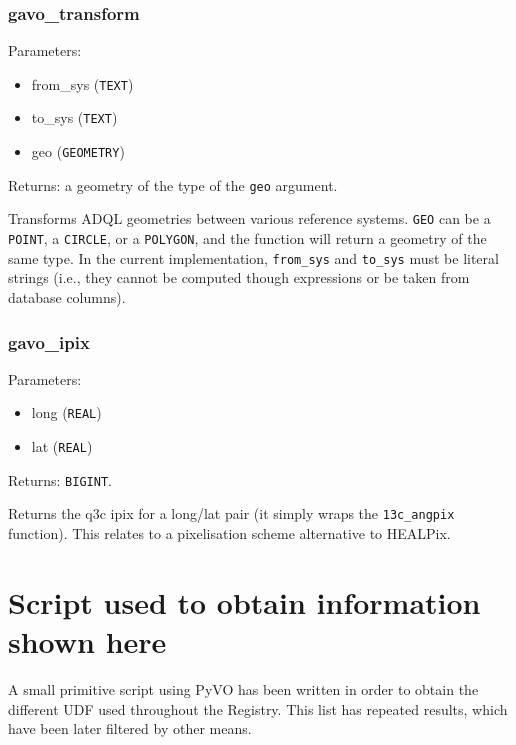 \documentclass[11pt,a4paper]{ivoa}
\begin{document}
\subsubsection{gavo\_transform}

Parameters:

\begin{itemize}
	\item from\_sys (\texttt{TEXT})
	\item to\_sys (\texttt{TEXT})
	\item geo (\texttt{GEOMETRY})
\end{itemize}

Returns: a geometry of the type of the \texttt{geo} argument.

Transforms ADQL geometries between various reference systems.
\texttt{GEO} can be a \texttt{POINT}, a \texttt{CIRCLE}, or a
\texttt{POLYGON}, and the function will return a geometry of the same
type. In the current implementation, \texttt{from\_sys} and
\texttt{to\_sys} must be literal strings (i.e., they cannot be computed
though expressions or be taken from database columns).

\subsubsection{gavo\_ipix}

Parameters:

\begin{itemize}
	\item long (\texttt{REAL})
	\item lat (\texttt{REAL})
\end{itemize}

Returns: \texttt{BIGINT}.

Returns the q3c ipix \citep{soft:q3c} for a long/lat pair (it simply
wraps the \texttt{13c\_angpix} function). This relates to a pixelisation
scheme alternative to HEALPix.

\appendix

\section{Script used to obtain information shown here}

A small primitive script using PyVO has been written in order to obtain
the different UDF used throughout the Registry. This list has repeated
results, which have been later filtered by other means.
\end{document}
